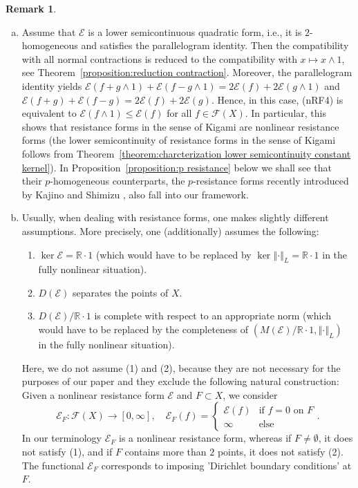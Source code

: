 \documentclass[a4paper,11pt,reqno]{amsart}
\theoremstyle{definition}
\newtheorem{remark}[lemma]{Remark}
\numberwithin{equation}{section}
\newcommand{\cE}{{\mathcal E}}
\newcommand{\cF}{{\mathcal F}}
\newcommand{\R}{{\mathbb R}}
\newcommand{\av}[1]{\left\Vert #1\right\Vert}
\newcommand{\1}{\mathds{1}}
\begin{document}
\begin{remark}
\begin{enumerate}[(a)]
 \item Assume that $\cE$ is a lower semicontinuous quadratic form, i.e., it is $2$-homogeneous and satisfies the parallelogram identity. Then the compatibility with all normal contractions is reduced to the compatibility with $x \mapsto x \wedge 1$, see Theorem~\ref{proposition:reduction contraction}. Moreover, the parallelogram identity yields  $\cE(f + g \wedge 1) + \cE(f - g \wedge 1) = 2 \cE(f) + 2\cE(g \wedge 1)$ and $\cE(f + g) + \cE(f - g) = 2\cE(f) + 2\cE(g)$. Hence, in this case, (nRF4) is equivalent to $\cE(f \wedge 1) \leq \cE(f)$ for all $f \in \cF(X)$. In particular, this shows that resistance forms in the sense of Kigami \cite{Kig03} are nonlinear resistance forms (the lower semicontinuity of resistance forms in the sense of Kigami \cite{Kig03} follows from Theorem~\ref{theorem:charcterization lower semicontinuity constant kernel}).  In Proposition~\ref{proposition:p resistance} below we shall see that their $p$-homogeneous counterparts, the $p$-resistance forms recently introduced by Kajino and Shimizu \cite{KS25}, also fall into our framework.
 
 \item Usually, when dealing with resistance forms, one makes slightly different assumptions. More precisely, one (additionally) assumes the following: 
 \begin{enumerate}[(1)]
  \item   $\ker \cE = \R \cdot 1$   (which would have to be replaced by $\ker \av{\cdot}_L = \R \cdot 1$ in the fully nonlinear situation). 
  \item  $D(\cE)$ separates the points of $X$.
  \item $D(\cE)/\R \cdot 1$ is complete with respect to an appropriate norm (which would have to be replaced by the completeness of $(M(\cE)/\R \cdot 1,\av{\cdot}_L)$ in the fully nonlinear situation). 
 \end{enumerate}

 Here, we do not assume (1) and (2), because they are not necessary for the purposes of our paper and they exclude the following natural construction: Given a nonlinear resistance form $\cE$ and $F \subset X$, we consider  
 $$\cE_F \colon \cF(X) \to [0,\infty], \quad \cE_F(f) = \begin{cases}
                                                         \cE(f) &\text{if } f =  0 \text{ on }F\\
                                                         \infty &\text{else}
                                                        \end{cases}.
$$
%
In our terminology $\cE_F$  is a nonlinear resistance form, whereas if $F \neq \emptyset$, it does not satisfy (1),  and if $F$ contains more than $2$ points, it does not satisfy  (2). The functional $\cE_F$ corresponds to imposing 'Dirichlet boundary conditions' at $F$. 


\end{enumerate}
\end{remark}
\end{document}
